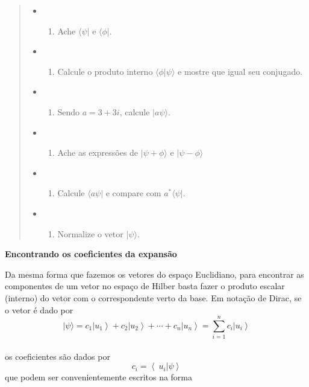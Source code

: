 \documentclass[11pt]{article}
\providecommand{\tightlist}{%
      \setlength{\itemsep}{0pt}\setlength{\parskip}{0pt}}
\begin{document}
\begin{quote}
\begin{itemize}
\item
  \begin{enumerate}
  \def\labelenumi{\alph{enumi})}
  \tightlist
  \item
    Ache \(\langle\psi|\) e \(\langle \phi|\).\\
  \end{enumerate}
\item
  \begin{enumerate}
  \def\labelenumi{\alph{enumi})}
  \setcounter{enumi}{1}
  \tightlist
  \item
    Calcule o produto interno \(\langle \phi|\psi\rangle\) e mostre que
    igual seu conjugado.
  \end{enumerate}
\item
  \begin{enumerate}
  \def\labelenumi{\alph{enumi})}
  \setcounter{enumi}{2}
  \tightlist
  \item
    Sendo \(a = 3 + 3i\), calcule \(|a\psi\rangle\).
  \end{enumerate}
\item
  \begin{enumerate}
  \def\labelenumi{\alph{enumi})}
  \setcounter{enumi}{3}
  \tightlist
  \item
    Ache as expressões de \(|\psi+\phi\rangle\) e \(|\psi-\phi\rangle\)
  \end{enumerate}
\item
  \begin{enumerate}
  \def\labelenumi{\alph{enumi})}
  \setcounter{enumi}{4}
  \tightlist
  \item
    Calcule \(\langle a \psi |\) e compare com \(a^* \langle \psi|\).
  \end{enumerate}
\item
  \begin{enumerate}
  \def\labelenumi{\alph{enumi})}
  \setcounter{enumi}{5}
  \tightlist
  \item
    Normalize o vetor \(| \psi \rangle\).
  \end{enumerate}
\end{itemize}
\end{quote}

    \textbf{Encontrando os coeficientes da expansão}

Da mesma forma que fazemos os vetores do espaço Euclidiano, para
encontrar as componentes de um vetor no espaço de Hilber basta fazer o
produto escalar (interno) do vetor com o correspondente verto da base.
Em notação de Dirac, se o vetor é dado por \[
|\psi\rangle=c_{1}\left|u_{1}\right\rangle+c_{2}\left|u_{2}\right\rangle+\cdots+c_{n}\left|u_{n}\right\rangle=\sum_{i=1}^{n} c_{i}\left|u_{i}\right\rangle
\]\\
os coeficientes são dados por \[
c_i = \left\langle\ u_i | \psi \right\rangle
\] que podem ser convenientemente escritos na forma
\end{document}
